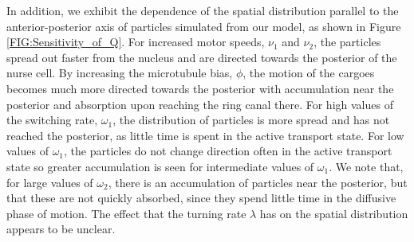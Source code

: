 \documentclass[twocolumn]{biophys}
\begin{document}
In addition, we exhibit the dependence of the spatial distribution parallel to the anterior-posterior axis of particles simulated from our model, as shown in Figure \ref{FIG:Sensitivity_of_Q}.
For increased motor speeds, $\nu_1$ and $\nu_2$, the particles spread out faster from the nucleus and are directed towards the posterior of the nurse cell.
By increasing the microtubule bias, $\phi$, the motion of the cargoes becomes much more directed towards the posterior with accumulation near the posterior and absorption upon reaching the ring canal there.
For high values of the switching rate, $\omega_1$, the distribution of particles is more spread and has not reached the posterior, as little time is spent in the active transport state.
For low values of $\omega_1$, the particles do not change direction often in the active transport state so greater accumulation is seen for intermediate values of $\omega_1$.
We note that, for large values of $\omega_2$, there is an accumulation of particles near the posterior, but that these are not quickly absorbed, since they spend little time in the diffusive phase of motion.
The effect that the turning rate $\lambda$ has on the spatial distribution appears to be unclear.
\end{document}
